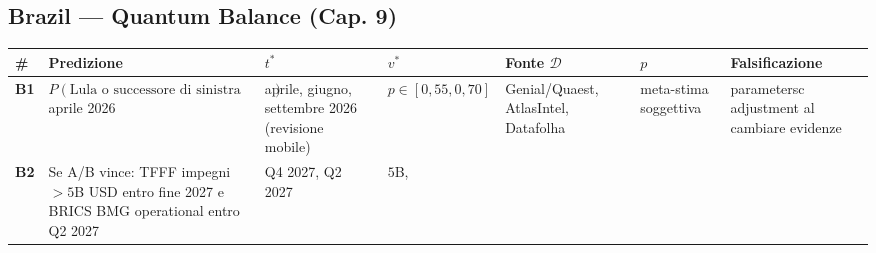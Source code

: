 \subsection{Brazil --- Quantum Balance (Cap.
9)}\label{brasile-bilanciere-quantistico-cap.-9}

{\def\LTcaptype{none} %
{\small\begin{longtable}[]{@{}
  >{\raggedright\arraybackslash}p{}
  >{\raggedright\arraybackslash}p{}
  >{\raggedright\arraybackslash}p{}
  >{\raggedright\arraybackslash}p{}
  >{\raggedright\arraybackslash}p{}
  >{\raggedright\arraybackslash}p{}
  >{\raggedright\arraybackslash}p{}@{}}
\toprule\noalign{}
\begin{minipage}[b]{\linewidth}\raggedright
\#
\end{minipage} & \begin{minipage}[b]{\linewidth}\raggedright
Predizione
\end{minipage} & \begin{minipage}[b]{\linewidth}\raggedright
\(t^*\)
\end{minipage} & \begin{minipage}[b]{\linewidth}\raggedright
\(v^*\)
\end{minipage} & \begin{minipage}[b]{\linewidth}\raggedright
Fonte \(\mathcal{D}\)
\end{minipage} & \begin{minipage}[b]{\linewidth}\raggedright
\(p\)
\end{minipage} & \begin{minipage}[b]{\linewidth}\raggedright
Falsificazione
\end{minipage} \\
\midrule\noalign{}
\endhead
\bottomrule\noalign{}
\endlastfoot
\textbf{B1} & \(P(\text{Lula o successore di sinistra vince elezioni})\)
aprile 2026 & aprile, giugno, settembre 2026 (revisione mobile) &
\(p \in [0{,}55, 0{,}70]\) & Genial/Quaest, AtlasIntel, Datafolha &
meta-stima soggettiva & parametersc adjustment al cambiare
evidenze \\
\textbf{B2} & Se A/B vince: TFFF impegni \(> 5\)B USD entro fine 2027 e
BRICS BMG operational entro Q2 2027 & Q4 2027, Q2 2027 & \(5\)B,

\end{longtable}}}
